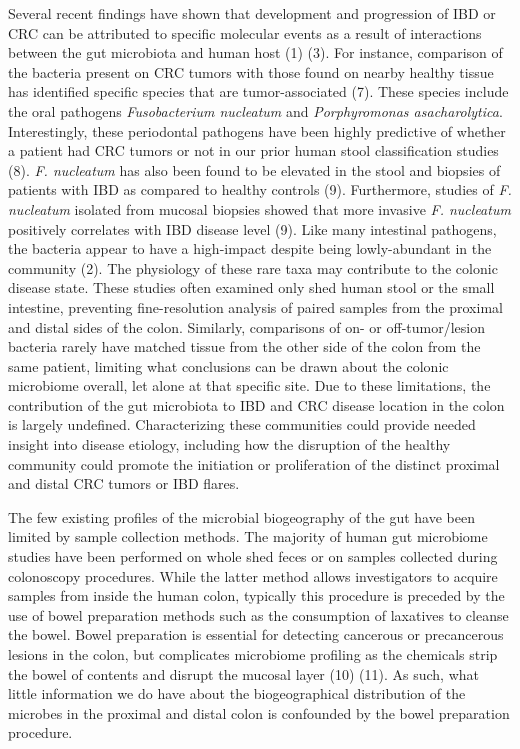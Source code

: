 \documentclass[11pt,]{article}
\begin{document}
Several recent findings have shown that development and progression of
IBD or CRC can be attributed to specific molecular events as a result of
interactions between the gut microbiota and human host (1) (3). For
instance, comparison of the bacteria present on CRC tumors with those
found on nearby healthy tissue has identified specific species that are
tumor-associated (7). These species include the oral pathogens
\emph{Fusobacterium nucleatum} and \emph{Porphyromonas asacharolytica}.
Interestingly, these periodontal pathogens have been highly predictive
of whether a patient had CRC tumors or not in our prior human stool
classification studies (8). \emph{F. nucleatum} has also been found to
be elevated in the stool and biopsies of patients with IBD as compared
to healthy controls (9). Furthermore, studies of \emph{F. nucleatum}
isolated from mucosal biopsies showed that more invasive \emph{F.
nucleatum} positively correlates with IBD disease level (9). Like many
intestinal pathogens, the bacteria appear to have a high-impact despite
being lowly-abundant in the community (2). The physiology of these rare
taxa may contribute to the colonic disease state. These studies often
examined only shed human stool or the small intestine, preventing
fine-resolution analysis of paired samples from the proximal and distal
sides of the colon. Similarly, comparisons of on- or off-tumor/lesion
bacteria rarely have matched tissue from the other side of the colon
from the same patient, limiting what conclusions can be drawn about the
colonic microbiome overall, let alone at that specific site. Due to
these limitations, the contribution of the gut microbiota to IBD and CRC
disease location in the colon is largely undefined. Characterizing these
communities could provide needed insight into disease etiology,
including how the disruption of the healthy community could promote the
initiation or proliferation of the distinct proximal and distal CRC
tumors or IBD flares.

The few existing profiles of the microbial biogeography of the gut have
been limited by sample collection methods. The majority of human gut
microbiome studies have been performed on whole shed feces or on samples
collected during colonoscopy procedures. While the latter method allows
investigators to acquire samples from inside the human colon, typically
this procedure is preceded by the use of bowel preparation methods such
as the consumption of laxatives to cleanse the bowel. Bowel preparation
is essential for detecting cancerous or precancerous lesions in the
colon, but complicates microbiome profiling as the chemicals strip the
bowel of contents and disrupt the mucosal layer (10) (11). As such, what
little information we do have about the biogeographical distribution of
the microbes in the proximal and distal colon is confounded by the bowel
preparation procedure.
\end{document}
